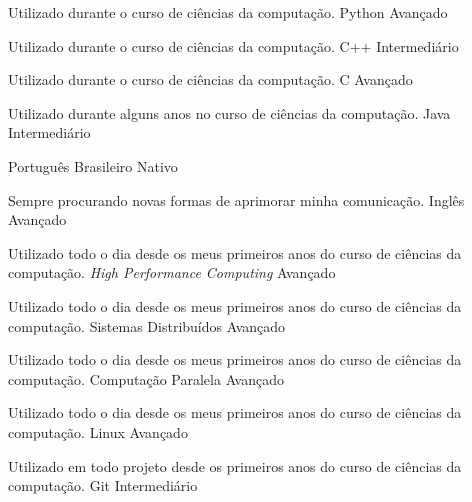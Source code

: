 

\begin{cventries}

    \cventry
    {Utilizado durante o curso de ciências da computação.}
    {Python} %
    {Avançado} %
    {}
    {}

    \cventry
    {Utilizado durante o curso de ciências da computação.}
    {C++} %
    {Intermediário} %
    {}
    {}

    \cventry
    {Utilizado durante o curso de ciências da computação.}
    {C} %
    {Avançado} %
    {}
    {}

    \cventry
    {Utilizado durante alguns anos no curso de ciências da computação.}
    {Java} %
    {Intermediário} %
    {}
    {}
\end{cventries}

\begin{cventries}

  \cventry
  {}
  {Português Brasileiro}
  {Nativo}
  {}
  {}

  \cventry
  {Sempre procurando novas formas de aprimorar minha comunicação.}
  {Inglês}
  {Avançado}
  {}
  {}

\end{cventries}

\begin{cventries}

  \cventry
  {Utilizado todo o dia desde os meus primeiros anos do curso de ciências da
  computação.}
  {\textit{High Performance Computing}}
  {Avançado}
  {}
  {}

  \cventry
  {Utilizado todo o dia desde os meus primeiros anos do curso de ciências da
  computação.}
  {Sistemas Distribuídos}
  {Avançado}
  {}
  {}

  \cventry
  {Utilizado todo o dia desde os meus primeiros anos do curso de ciências da
  computação.}
  {Computação Paralela}
  {Avançado}
  {}
  {}

  \cventry
  {Utilizado todo o dia desde os meus primeiros anos do curso de ciências da
  computação.}
  {Linux}
  {Avançado}
  {}
  {}

  \cventry
  {Utilizado em todo projeto desde os primeiros anos do curso de ciências da
  computação.}
  {Git}
  {Intermediário}
  {}
  {}

\end{cventries}
